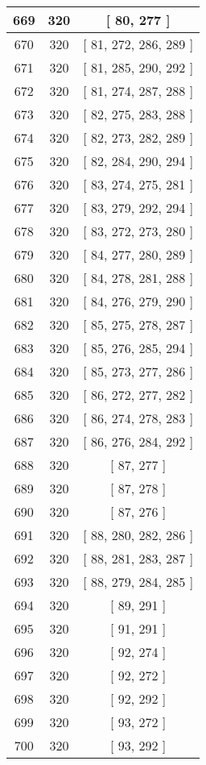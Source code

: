 \begin{center}
\begin{longtable}[H]{|| c c c ||}
\hline
669 & 320 & [ 80, 277 ] \\ 
\hline
670 & 320 & [ 81, 272, 286, 289 ] \\ 
\hline
671 & 320 & [ 81, 285, 290, 292 ] \\ 
\hline
672 & 320 & [ 81, 274, 287, 288 ] \\ 
\hline
673 & 320 & [ 82, 275, 283, 288 ] \\ 
\hline
674 & 320 & [ 82, 273, 282, 289 ] \\ 
\hline
675 & 320 & [ 82, 284, 290, 294 ] \\ 
\hline
676 & 320 & [ 83, 274, 275, 281 ] \\ 
\hline
677 & 320 & [ 83, 279, 292, 294 ] \\ 
\hline
678 & 320 & [ 83, 272, 273, 280 ] \\ 
\hline
679 & 320 & [ 84, 277, 280, 289 ] \\ 
\hline
680 & 320 & [ 84, 278, 281, 288 ] \\ 
\hline
681 & 320 & [ 84, 276, 279, 290 ] \\ 
\hline
682 & 320 & [ 85, 275, 278, 287 ] \\ 
\hline
683 & 320 & [ 85, 276, 285, 294 ] \\ 
\hline
684 & 320 & [ 85, 273, 277, 286 ] \\ 
\hline
685 & 320 & [ 86, 272, 277, 282 ] \\ 
\hline
686 & 320 & [ 86, 274, 278, 283 ] \\ 
\hline
687 & 320 & [ 86, 276, 284, 292 ] \\ 
\hline
688 & 320 & [ 87, 277 ] \\ 
\hline
689 & 320 & [ 87, 278 ] \\ 
\hline
690 & 320 & [ 87, 276 ] \\ 
\hline
691 & 320 & [ 88, 280, 282, 286 ] \\ 
\hline
692 & 320 & [ 88, 281, 283, 287 ] \\ 
\hline
693 & 320 & [ 88, 279, 284, 285 ] \\ 
\hline
694 & 320 & [ 89, 291 ] \\ 
\hline
695 & 320 & [ 91, 291 ] \\ 
\hline
696 & 320 & [ 92, 274 ] \\ 
\hline
697 & 320 & [ 92, 272 ] \\ 
\hline
698 & 320 & [ 92, 292 ] \\ 
\hline
699 & 320 & [ 93, 272 ] \\ 
\hline
700 & 320 & [ 93, 292 ] \\ 

\end{longtable}
\end{center}
